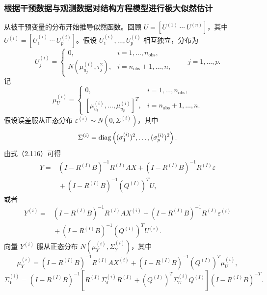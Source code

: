 \subsubsection{根据干预数据与观测数据对结构方程模型进行极大似然估计}

从被干预变量的分布开始推导似然函数。回顾 $U=[U^{(1)}\ \cdots\ U^{(n)}]$，其中 $U^{(i)}=[U_1^{(i)}\ \cdots\ U_p^{(i)}]$。假设 $U_1^{(i)},\ldots,U_p^{(i)}$ 相互独立，分布为
\begin{equation}
U_j^{(i)}=
\begin{cases}
0,&i=1,\ldots,n_{\mathrm{obs}},\\
N(\mu_{u_j}^{(i)},\tau_j^2),&i=n_{\mathrm{obs}}+1,\ldots,n,
\end{cases}
\qquad j=1,\ldots,p.
\tag{2.117}
\end{equation}
记
\begin{equation}
\mu_U^{(i)}=
\begin{cases}
0,&i=1,\ldots,n_{\mathrm{obs}},\\
[\mu_{u_1}^{(i)},\ldots,\mu_{u_p}^{(i)}]^T,
&i=n_{\mathrm{obs}}+1,\ldots,n.
\end{cases}
\tag{2.118}
\end{equation}
假设误差服从正态分布 $\varepsilon^{(i)}\sim N(0,\Sigma^{(i)})$，其中
\[
\Sigma^{(i)}=\operatorname{diag}\left((\sigma_1^{(i)})^2,\ldots,(\sigma_p^{(i)})^2\right).
\]
由式（2.116）可得
\begin{equation}
\begin{aligned}
Y={}&(I-R^{(I)}B)^{-1}R^{(I)}AX
+(I-R^{(I)}B)^{-1}R^{(I)}\varepsilon\\
&{}+(I-R^{(I)}B)^{-1}(Q^{(I)})^TU,
\end{aligned}\tag{2.119}
\end{equation}
或者
\begin{equation}
\begin{aligned}
Y^{(i)}={}&(I-R^{(I)}B)^{-1}R^{(I)}AX^{(i)}
+(I-R^{(I)}B)^{-1}R^{(I)}\varepsilon^{(i)}\\
&{}+(I-R^{(I)}B)^{-1}(Q^{(I)})^TU^{(i)}.
\end{aligned}\tag{2.120}
\end{equation}
向量 $Y^{(i)}$ 服从正态分布 $N(\mu_Y^{(i)},\Sigma_Y^{(i)})$，其中
\begin{equation}
\mu_Y^{(i)}=(I-R^{(I)}B)^{-1}R^{(I)}AX^{(i)}
+(I-R^{(I)}B)^{-1}(Q^{(I)})^T\mu_U^{(i)},
\tag{2.121}
\end{equation}
\begin{equation}
\Sigma_Y^{(i)}
=(I-R^{(I)}B)^{-1}
\left[R^{(I)}\Sigma_\varepsilon^{(i)}R^{(I)}
+(Q^{(I)})^T\Sigma_U^{(i)}Q^{(I)}\right]
(I-R^{(I)}B)^{-T}.
\tag{2.122}
\end{equation}
